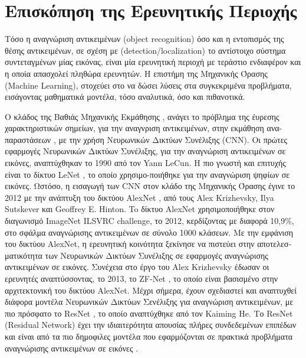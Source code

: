 \chapter{Επισκόπηση της Ερευνητικής Περιοχής}
\label{chapter:sota}
Τόσο η αναγνώριση αντικειμένων (object recognition) όσο και η εντοπισμός
της θέσης αντικειμένων, σε σχέση με (detection/localization)
το αντίστοιχο σύστημα συντεταγμένων μίας εικόνας, είναι μία ερευνητική περιοχή με τεράστιο ενδιαφέρον και
η οποία απασχολεί πληθώρα ερευνητών. Η επιστήμη της Μηχανικής Όρασης (Machine Learning),
στοχεύει στο να δώσει λύσεις στα συγκεκριμένα προβλήματα, εισάγοντας μαθηματικά
μοντέλα, τόσο αναλυτικά, όσο και πιθανοτικά.

O κλάδος της Βαθιάς Μηχανικής Εκμάθησης \cite{Goodfellow-et-al-2016-Book},
ανάγει το πρόβλημα της έυρεσης χαρακτηριστικών σημείων, για την αναγνριση αντικειμένων,
στην εκμάθηση ανα-παραστάσεων \cite{bengio2013representation}, με την χρήση Νευρωνικών Δικτύων Συνέλιξης (CNN).
Οι πρώτες εφαρμογές Νευρωνικών Δικτύων Συνέλιξης, για την αναγνώριση αντικειμένων
σε εικόνες, αναπτύχθηκαν το 1990 από τον Yann LeCun.
Η πιο γνωστή και επιτυχής είναι το δίκτυο LeNet \cite{lecun1998gradient}, το οποίο
χρησιμο-ποιήθηκε για την αναγνώριση ψηφίων σε εικόνες.
Ωστόσο, η εισαγωγή των CNN στον κλάδο της Μηχανικής Όρασης έγινε το 2012 με
την ανάπτυξη του δικτύου AlexNet \cite{NIPS2012_4824}, από τους Alex Krizhevsky,
Ilya Sutskever και Geoffrey E. Hinton. To δίκτυο AlexNet χρησιμοποιήθηκε
στον διαγωνισμό ImageNet ILSVRC challenge, το 2012, κερδίζοντας με διαφορά
10,9\%, στο σφάλμα αναγνώρισης αντικειμένων σε σύνολο 1000 κλάσεων.
Με την εμφάνιση του δικτύου AlexNet, η ερευνητική κοινότητα ξεκίνησε να
πιστεύει στην αποτελεσ-ματικότητα των Νευρωνικών Δικτύων Συνέλιξης σε εφαρμογές αναγνώρισης \\
αντικειμένων σε εικόνες. Συνέχεια στο έργο του Alex Krizhevsky έδωσαν οι \\
ερευνητές αναπτύσσοντας, το 2013, το ZF-Net \cite{DBLP:journals/corr/ZeilerF13}, το οποίο είναι
βασισμένο στην αρχιτεκτονική του δικτύου AlexNet. Μέχρι σήμερα, έχουν σχεδιαστεί
και αναπτυχθεί διάφορα μοντέλα Νευρωνικών Δικτύων Σενέλιξης για
αναγνώριση αντικειμένων, με πιο πρόσφατο το ResNet \cite{DBLP:journals/corr/HeZRS15},
το οποίο αναπτύχθηκε από τον Kaiming He. Το ResNet (Residual Network) έχει την
ιδιαιτερότητα απουσίας πλήρες συνδεδεμένων επιπέδων και είναι από τα πιο δημοφιλες
μοντέλα που εφαρμόζονται σε πρακτικά προβλήματα αναγνώρισης αντικειμένων σε
εικόνες \cite{DBLP:journals/corr/HeZR016}.

